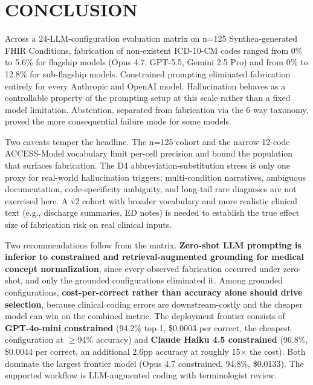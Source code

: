\section{CONCLUSION}\label{conclusion}

Across a 24-LLM-configuration evaluation matrix on n=125
Synthea-generated FHIR Conditions, fabrication of non-existent
ICD-10-CM codes ranged from 0\% to 5.6\% for flagship models (Opus
4.7, GPT-5.5, Gemini 2.5 Pro) and from 0\% to 12.8\% for sub-flagship
models. Constrained prompting eliminated fabrication entirely for
every Anthropic and OpenAI model. Hallucination behaves as a
controllable property of the prompting setup at this scale rather
than a fixed model limitation. Abstention, separated from
fabrication via the 6-way taxonomy, proved the more consequential
failure mode for some models.

Two caveats temper the headline. The n=125 cohort and the narrow
12-code ACCESS-Model vocabulary limit per-cell precision and bound
the population that surfaces fabrication. The D4
abbreviation-substitution stress is only one proxy for real-world
hallucination triggers; multi-condition narratives, ambiguous
documentation, code-specificity ambiguity, and long-tail rare
diagnoses are not exercised here. A v2 cohort with broader
vocabulary and more realistic clinical text (e.g., discharge
summaries, ED notes) is needed to establish the true effect size
of fabrication risk on real clinical inputs.

Two recommendations follow from the matrix. \textbf{Zero-shot LLM prompting
is inferior to constrained and retrieval-augmented grounding for
medical concept normalization}, since every observed fabrication
occurred under zero-shot, and only the grounded configurations
eliminated it. Among
grounded configurations, \textbf{cost-per-correct rather than accuracy
alone should drive selection}, because clinical coding errors are
downstream-costly and the cheaper model can win on the combined
metric. The deployment frontier consists of \textbf{GPT-4o-mini
constrained} (94.2\% top-1, \$0.0003 per correct, the cheapest
configuration at $\geq$94\% accuracy) and \textbf{Claude Haiku 4.5
constrained} (96.8\%, \$0.0044 per correct, an additional 2.6pp
accuracy at roughly 15× the cost). Both dominate the largest
frontier model (Opus 4.7 constrained, 94.8\%, \$0.0133). The
supported workflow is LLM-augmented coding with terminologist
review.
